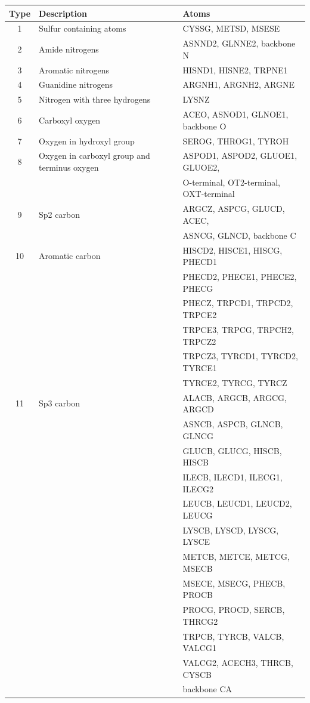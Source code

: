 \documentclass[a4paper,10pt]{article}
\begin{document}
\begin{table}[H]
\begin{center}
\begin{tabular}{ c | l | l }
    
    Type & Description & Atoms \\
    \hline
    1 & Sulfur containing atoms & CYSSG, METSD, MSESE \\ \hline
    2 & Amide nitrogens & ASNND2, GLNNE2, backbone N \\ \hline
    3 & Aromatic nitrogens & HISND1, HISNE2, TRPNE1 \\ \hline
    4 & Guanidine nitrogens & ARGNH1, ARGNH2, ARGNE \\ \hline
    5 & Nitrogen with three hydrogens & LYSNZ \\ \hline
    6 & Carboxyl oxygen & ACEO, ASNOD1, GLNOE1, backbone O \\ \hline
    7 & Oxygen in hydroxyl group & SEROG, THROG1, TYROH \\ \hline
    8 & Oxygen in carboxyl group and terminus oxygen & ASPOD1, ASPOD2, GLUOE1, GLUOE2, \\
     & &  O-terminal, OT2-terminal, OXT-terminal \\ \hline
    9 & Sp2 carbon & ARGCZ, ASPCG, GLUCD, ACEC, \\
     & & ASNCG, GLNCD, backbone C\\ \hline
    10 & Aromatic carbon & HISCD2, HISCE1, HISCG, PHECD1 \\
     & & PHECD2, PHECE1, PHECE2, PHECG \\ 
     & & PHECZ, TRPCD1, TRPCD2, TRPCE2 \\
     & & TRPCE3, TRPCG, TRPCH2, TRPCZ2 \\
     & & TRPCZ3, TYRCD1, TYRCD2, TYRCE1 \\
     & & TYRCE2, TYRCG, TYRCZ \\ \hline
    11 & Sp3 carbon & ALACB, ARGCB, ARGCG, ARGCD \\
     & & ASNCB, ASPCB, GLNCB, GLNCG\\
     & & GLUCB, GLUCG, HISCB, HISCB \\
     & & ILECB, ILECD1, ILECG1, ILECG2 \\
     & & LEUCB, LEUCD1, LEUCD2, LEUCG \\
     & & LYSCB, LYSCD, LYSCG, LYSCE \\
     & & METCB, METCE, METCG, MSECB \\
     & & MSECE, MSECG, PHECB, PROCB \\
     & & PROCG, PROCD, SERCB, THRCG2 \\
     & & TRPCB, TYRCB, VALCB, VALCG1 \\
     & & VALCG2, ACECH3, THRCB, CYSCB \\
     & & backbone CA \\ \hline
    

\end{tabular}
\end{center}
\end{table}
\end{document}
